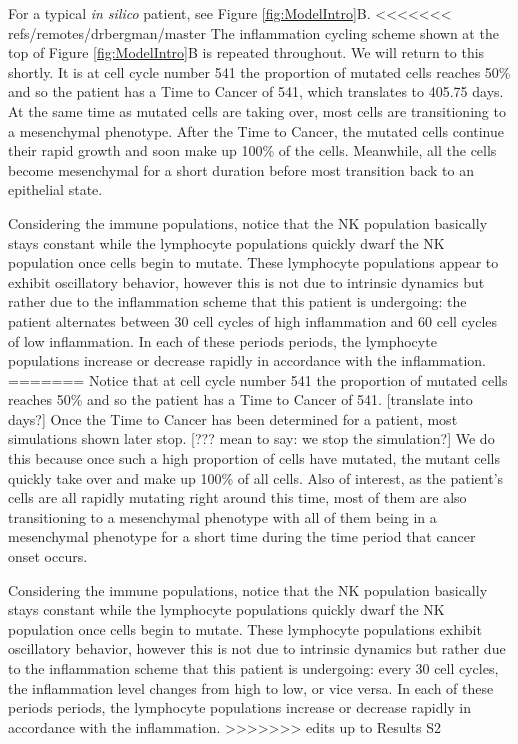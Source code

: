 \documentclass{article}
\begin{document}
For a typical {\it in silico} patient, see Figure \ref{fig:ModelIntro}B.
<<<<<<< refs/remotes/drbergman/master
The inflammation cycling scheme shown at the top of Figure \ref{fig:ModelIntro}B is repeated throughout.
We will return to this shortly.
It is at cell cycle number 541 the proportion of mutated cells reaches 50\% and so the patient has a Time to Cancer of 541, which translates to 405.75 days. %
At the same time as mutated cells are taking over, most cells are transitioning to a mesenchymal phenotype.
After the Time to Cancer, the mutated cells continue their rapid growth and soon make up 100\% of the cells.
Meanwhile, all the cells become mesenchymal for a short duration before most transition back to an epithelial state.

Considering the immune populations, notice that the NK population basically stays constant while the lymphocyte populations quickly dwarf the NK population once cells begin to mutate.
These lymphocyte populations appear to exhibit oscillatory behavior, however this is not due to intrinsic dynamics but rather due to the inflammation scheme that this patient is undergoing: 
the patient alternates between 30 cell cycles of high inflammation and 60 cell cycles of low inflammation.
In each of these periods periods, the lymphocyte populations increase or decrease rapidly in accordance with the inflammation.
=======
Notice that at cell cycle number 541 the proportion of mutated cells reaches 50\% and so the patient has a Time to Cancer of 541. [translate into days?]
Once the Time to Cancer has been determined for a patient, most simulations shown later stop. [??? mean to say: we stop the simulation?]
We do this because once such a high proportion of cells have mutated, the mutant cells quickly take over and make up 100\% of all cells.
Also of interest, as the patient's cells are all rapidly mutating right around this time, most of them are also transitioning to a mesenchymal phenotype with all of them being in a mesenchymal phenotype for a short time during the time period that cancer onset occurs.

Considering the immune populations, notice that the NK population basically stays constant while the lymphocyte populations quickly dwarf the NK population once cells begin to mutate.
These lymphocyte populations exhibit oscillatory behavior, however this is not due to intrinsic dynamics but rather due to the inflammation scheme that this patient is undergoing: every 30 cell cycles, the inflammation level changes from high to low, or vice versa. In each of these periods periods, the lymphocyte populations increase or decrease rapidly in accordance with the inflammation.
>>>>>>> edits up to Results S2
\end{document}
